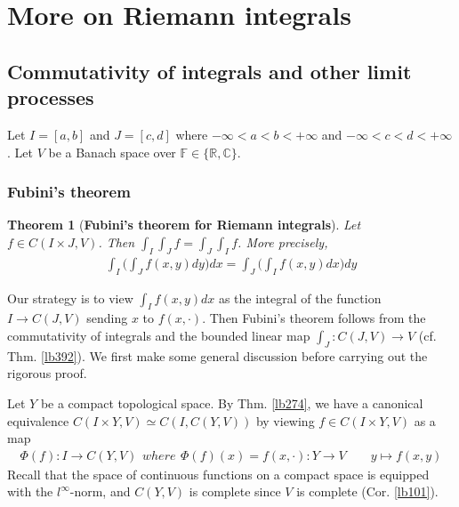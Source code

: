 \documentclass[12pt,b5paper,notitlepage]{article}
\theoremstyle{definition}
\theoremstyle{plain}
\newtheorem{thm}[df]{Theorem}
\newcommand{\Cbb}{\mathbb C}
\newcommand{\Rbb}{\mathbb R}
\newcommand{\Fbb}{\mathbb F}
\numberwithin{equation}{section}
\begin{document}
\newpage




\section{More on Riemann integrals}


\subsection{Commutativity of integrals and other limit processes}\label{lb419}


Let $I=[a,b]$ and $J=[c,d]$ where $-\infty<a<b<+\infty$ and $-\infty<c<d<+\infty$. Let $V$ be a Banach space over $\Fbb\in\{\Rbb,\Cbb\}$.


\subsubsection{Fubini's theorem}


\begin{thm}[\textbf{Fubini's theorem for Riemann integrals}] \label{lb399} 
Let $f\in C(I\times J,V)$. Then $\int_I\int_Jf=\int_J\int_If$. More precisely,
\begin{align}
\int_I\Big(\int_Jf(x,y)dy\Big)dx=\int_J\Big(\int_I f(x,y)dx\Big)dy
\end{align}
\end{thm}

Our strategy is to view $\int_I f(x,y)dx$ as the integral of the function $I\rightarrow C(J,V)$ sending $x$ to $f(x,\cdot)$. Then Fubini's theorem follows from the commutativity of integrals and the bounded linear map $\int_J:C(J,V)\rightarrow V$ (cf. Thm. \ref{lb392}). We first make some general discussion before carrying out the rigorous proof.


Let $Y$ be a compact topological space. By Thm. \ref{lb274}, we have a canonical equivalence $C(I\times Y,V)\simeq C(I,C(Y,V))$ by viewing $f\in C(I\times Y,V)$ as a map
\begin{subequations}\label{eq167}
\begin{align}
\Phi(f):I\rightarrow C(Y,V)
\end{align}
where
\begin{align}
\Phi(f)(x)=f(x,\cdot):Y\rightarrow V\qquad y\mapsto f(x,y)
\end{align}
\end{subequations}
Recall that the space of continuous functions on a compact space is equipped with the $l^\infty$-norm, and $C(Y,V)$ is complete since $V$ is complete (Cor. \ref{lb101}).
\end{document}
